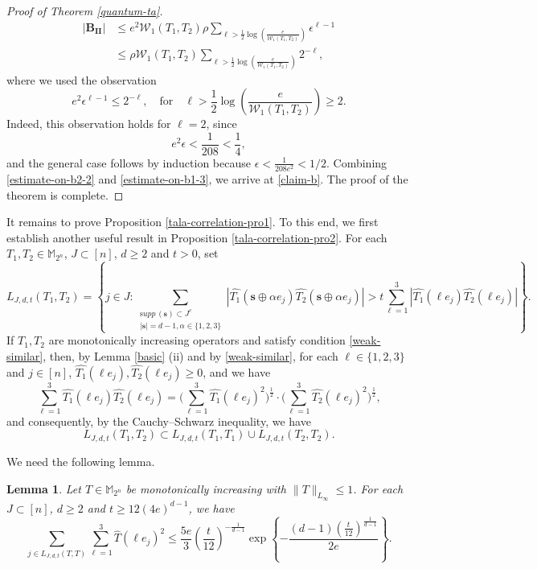 \documentclass{amsbook}
\newtheorem{lemma}[theorem]{Lemma}
\theoremstyle{definition}
\theoremstyle{remark}
\numberwithin{section}{chapter}
\numberwithin{equation}{chapter}
\newcommand{\1}{\mathbf{1}}
\newcommand{\s}{\mathbf{s}}
\newcommand{\supp}{{\mathrm supp}\,}
\begin{document}
\begin{proof}[Proof of Theorem \ref{quantum-ta}]
	\begin{equation}\label{estimate-on-b2-2}
	\begin{split}
|\mathbf{B_{II}}|&\leq e^2\mathcal{W}_1(T_1,T_2)\rho\sum_{\ell>\frac 12\log\left(\frac{e}{\mathcal{W}_1(T_1,T_2)}\right)}\epsilon^{\ell-1} \\
&\leq \rho \mathcal{W}_1(T_1,T_2)\sum_{\ell>\frac 12\log\left(\frac{e}{\mathcal{W}_1(T_1,T_2)}\right)}2^{-\ell},
\end{split}	
	\end{equation}
where we used the observation
\[
e^2\epsilon^{\ell-1}\leq2^{-\ell},
\quad \mbox{for}\quad  \ell>\frac 12\log\left(\frac{e}{\mathcal{W}_1(T_1,T_2)}\right)\geq2.
\]
Indeed, this observation holds for $\ell=2$, since
\[
e^2\epsilon<\frac1{208}<\frac14,
\]
and the general case follows by induction because
$\epsilon<\frac{1}{208e^{2}}<1/2$.	  Combining \eqref{estimate-on-b2-2} and \eqref{estimate-on-b1-3}, we arrive at \eqref{claim-b}. 
 The proof of the theorem is complete.
\end{proof}


It remains to prove Proposition \ref{tala-correlation-pro1}. To this end, we first establish another useful result in Proposition \ref{tala-correlation-pro2}. 
For each $T_1, T_2\in \mathbb{M}_{2^n}$, $J\subset [n]$, $d\geq2$ and $t>0$, set  
\[L_{J,d,t}(T_1,T_2)=\left\{j\in J:\sum_{\substack{\supp(\mathbf{s})\subset J^c \\ |\mathbf{s}|=d-1,\alpha\in\{1,2,3\}}}\left|\widehat{T_1}(\s\oplus \alpha e_j)\widehat{T_2}(\s\oplus \alpha e_j)\right|>t\sum_{\ell=1}^3\left|\widehat{T_1}(\ell e_j)\widehat{T_2}(\ell e_j)\right|\right\}.\]
If $T_1,T_2$ are  monotonically increasing operators  and satisfy condition \eqref{weak-similar},  then, by Lemma \ref{basic} (ii) and by  \eqref{weak-similar}, for each $\ell\in\{1,2,3\}$ and $j\in [n]$, $\widehat{T_1}(\ell e_j),\widehat{T_2}(\ell e_j)\geq0$, and we have 
$$\sum_{\ell=1}^3\widehat{T_1}(\ell e_j)\widehat{T_2}(\ell e_j)=\big(\sum_{\ell=1}^3\widehat{T_1}(\ell e_j)^2\big)^{\frac{1}{2}}\cdot\big(\sum_{\ell=1}^3\widehat{T_2}(\ell e_j)^2\big)^{\frac{1}{2}},$$ 
and consequently, by the Cauchy--Schwarz inequality, we have
\begin{equation}\label{lj}
L_{J,d,t}(T_1,T_2)\subset L_{J,d,t}(T_1,T_1)\cup L_{J,d,t}(T_2,T_2).
\end{equation}

We need the following lemma. 

\begin{lemma}\label{tala-correlation-lemma1-lemma}
Let $T\in \mathbb{M}_{2^n}$ be monotonically increasing with $\|T\|_{L_{\infty}}\leq 1$.	For each   $J\subset [n]$, $d\geq2$ and $t\geq 12(4e)^{d-1}$, we have
	\begin{equation}\label{tala-correlation-lemma1}
		\sum_{j\in L_{J,d,t}(T,T)}\sum_{\ell=1}^3\widehat{T}(\ell e_j)^2\leq \frac{5e}{3}(\frac{t}{12})^{-\frac{1}{d-1}}\exp\left\{-\frac{(d-1)(\frac{t}{12})^\frac{1}{d-1}}{2e}\right\}.
	\end{equation} 
\end{lemma}
\end{document}
